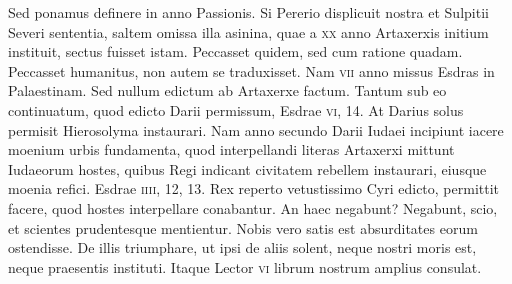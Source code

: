 Sed
ponamus definere in anno Passionis.
Si Pererio displicuit nostra et
Sulpitii Severi sententia, saltem omissa illa asinina, quae a \textsc{xx} anno
Artaxerxis initium instituit, sectus fuisset istam.
Peccasset quidem,
sed cum ratione quadam.
Peccasset humanitus, non autem
se traduxisset.
Nam \textsc{vii} anno missus Esdras in Palaestinam.
Sed nullum edictum ab Artaxerxe factum. Tantum sub eo continuatum,
quod edicto Darii permissum, Esdrae \textsc{vi}, 14.
At Darius
solus permisit Hierosolyma instaurari.
Nam anno secundo Darii
Iudaei incipiunt iacere moenium urbis fundamenta, quod interpellandi
literas Artaxerxi mittunt Iudaeorum hostes, quibus Regi indicant
civitatem rebellem instaurari, eiusque moenia refici.
Esdrae \textsc{iiii}, 12, 13.
Rex reperto vetustissimo Cyri edicto, permittit facere,
quod hostes interpellare conabantur.
An haec negabunt?
Negabunt, scio, et scientes prudentesque mentientur.
Nobis vero satis
est absurditates eorum ostendisse.
De illis triumphare, ut ipsi de
aliis solent, neque nostri moris est, neque praesentis instituti.
Itaque
Lector \textsc{vi} librum nostrum amplius consulat.

